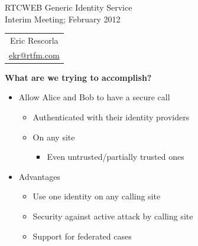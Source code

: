 \documentclass[helvetica]{seminar}
\newcommand{\heading}[1]{%
  \begin{center} 
    \large\bf 
    #1 
  \end{center} 
  \vspace{.4 in}}
\begin{document}
\begin{slide}
\begin{center}
\vspace{1 in}
\LARGE{{\bf}RTCWEB Generic Identity Service}\\
\vspace{.2in}
\large{{Interim Meeting; February 2012}} \\
\vspace{3em}
\large{
\begin{tabular}{c}
Eric Rescorla \\
\url{ekr@rtfm.com}
\end{tabular}
}
\end{center}

\end{slide}


\centerslidesfalse



\begin{slide}
\heading{What are we trying to accomplish?}

\begin{itemize}
\item Allow Alice and Bob to have a secure call
  \begin{itemize}
  \item Authenticated with their identity providers
  \item On any site
    \begin{itemize}
    \item Even untrusted/partially trusted ones
    \end{itemize}
  \end{itemize}

\item Advantages
  \begin{itemize}
  \item Use one identity on any calling site
  \item Security against active attack by calling site
  \item Support for federated cases
  \end{itemize}
\end{itemize}

\end{slide}
\end{document}
